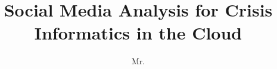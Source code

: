 \documentclass[defaultstyle,11pt]{thesis}
\title{Social Media Analysis for Crisis Informatics in the Cloud}
\author{Mr.}{Gerard Casas Saez}
\begin{document}

% 
% 












\nocite{*}		%

\appendix

% 
\end{document}
